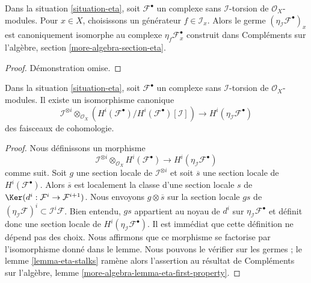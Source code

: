 \begin{lemma}

\label{lemma-eta-stalks}
Dans la situation \ref{situation-eta}, soit $\mathcal{F}^\bullet$ un complexe sans $\mathcal{I}$-torsion de $\mathcal{O}_X$-modules. Pour $x \in X$, choisissons un générateur $f \in \mathcal{I}_x$. Alors le germe $(\eta_\mathcal{I}\mathcal{F}^\bullet)_x$ est canoniquement isomorphe au complexe $\eta_f\mathcal{F}^\bullet_x$ construit dans Compléments sur l'algèbre, section \ref{more-algebra-section-eta}.
\end{lemma}

\begin{proof}
Démonstration omise.
\end{proof}

\begin{lemma}

\label{lemma-eta-first-property}

Dans la situation \ref{situation-eta},
soit $\mathcal{F}^\bullet$ un complexe sans
$\mathcal{I}$-torsion de $\mathcal{O}_X$-modules. Il existe un isomorphisme canonique
$$
\mathcal{I}^{\otimes i} \otimes_{\mathcal{O}_X}
\left(
H^i(\mathcal{F}^\bullet)/H^i(\mathcal{F}^\bullet)[\mathcal{I}]
\right)
\longrightarrow H^i(\eta_\mathcal{I}\mathcal{F}^\bullet)
$$
des faisceaux de cohomologie.

\end{lemma}

\begin{proof}

Nous définissons un morphisme
$$
\mathcal{I}^{\otimes i} \otimes_{\mathcal{O}_X} H^i(\mathcal{F}^\bullet)
\longrightarrow
H^i(\eta_\mathcal{I}\mathcal{F}^\bullet)
$$
comme suit. Soit $g$ une section locale de $\mathcal{I}^{\otimes i}$
et soit $\overline{s}$ une section locale de $H^i(\mathcal{F}^\bullet)$. Alors $\overline{s}$ est localement la classe d'une section locale $s$ de
$\Ker(d^i : \mathcal{F}^i \to \mathcal{F}^{i + 1})$. Nous envoyons $g \otimes \overline{s}$ sur la section locale
$gs$ de $(\eta_\mathcal{I}\mathcal{F})^i \subset \mathcal{I}^i\mathcal{F}$. Bien entendu, $gs$ appartient au noyau de $d^i$ sur
$\eta_\mathcal{I}\mathcal{F}^\bullet$ et définit donc une section locale de $H^i(\eta_\mathcal{I}\mathcal{F}^\bullet)$. Il est immédiat que cette définition ne dépend pas des choix. Nous affirmons que ce morphisme se factorise par l'isomorphisme donné dans le lemme. Nous pouvons le vérifier sur les germes ; le lemme \ref{lemma-eta-stalks} ramène alors l'assertion au résultat de Compléments sur l'algèbre, lemme \ref{more-algebra-lemma-eta-first-property}.

\end{proof}

